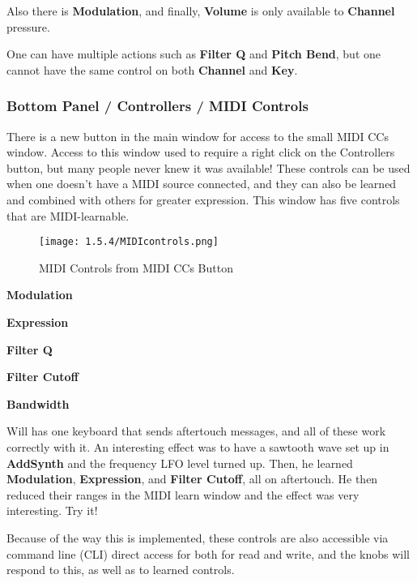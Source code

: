 Also there is \textbf{Modulation}, and finally, \textbf{Volume} is only available
to \textbf{Channel} pressure.

One can have multiple actions such as
\textbf{Filter Q} and \textbf{Pitch Bend},
but one cannot have the same control on both
\textbf{Channel} and \textbf{Key}.

\subsubsection{Bottom Panel / Controllers / MIDI Controls}
\label{subsubsec:bottom_panel_controllers_midi_controls}

   There is a new button in the main window for access to the small MIDI CCs
   window. Access to this window used to require a right click on the
   Controllers button, but many people never knew it was available!  These
   controls can be used when one doesn't have a MIDI source connected, and they
   can also be learned and combined with others for greater expression.  This
   window has five controls that are MIDI-learnable.

\begin{figure}[H]
   \centering
   \texttt{[image: 1.5.4/MIDIcontrols.png]}
   \caption{MIDI Controls from MIDI CCs Button}
   \label{fig:instrument_midi_controllers}
\end{figure}

   \begin{enumber}
      \item \textbf{Modulation}
      \item \textbf{Expression}
      \item \textbf{Filter Q}
      \item \textbf{Filter Cutoff}
      \item \textbf{Bandwidth}
   \end{enumber}

   \setcounter{ItemCounter}{0}      %

   Will has one keyboard that sends aftertouch messages, and all of these work
   correctly with it. An interesting effect was to have a sawtooth wave set up
   in \textbf{AddSynth} and the frequency LFO level turned up.  Then, he
   learned \textbf{Modulation}, \textbf{Expression}, and \textbf{Filter
   Cutoff}, all on aftertouch. He then reduced their ranges in the MIDI learn
   window and the effect was very interesting.  Try it!

   Because of the way this is implemented, these controls are also accessible
   via command line (CLI) direct access for both for read and write, and the
   knobs will respond to this, as well as to learned controls.

